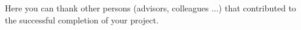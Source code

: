Here you can thank other persons (advisors, colleagues ...) that contributed to the successful completion of your project.
